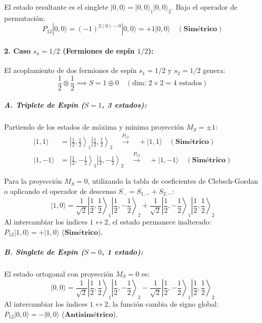 \begin{problema}
El estado resultante es el singlete $|0, 0\rangle = |0, 0\rangle_1 |0, 0\rangle_2$. Bajo el operador de permutación:
\begin{equation*}
P_{12} |0, 0\rangle = (-1)^{2(0) - 0} |0, 0\rangle = +1 |0, 0\rangle \quad (\mathbf{\text{Simétrico}})
\end{equation*}

\paragraph{2. Caso $s_a = 1/2$ (Fermiones de espín $1/2$):}
El acoplamiento de dos fermiones de espín $s_1 = 1/2$ y $s_2 = 1/2$ genera:
\begin{equation*}
\frac{1}{2} \otimes \frac{1}{2} \implies S = 1 \oplus 0 \quad (\text{dim: } 2 \times 2 = 4 \text{ estados})
\end{equation*}

\subparagraph{A. Triplete de Espín ($S = 1$, 3 estados):}
Partiendo de los estados de máxima y mínima proyección $M_S = \pm 1$:
\begin{align}
|1, 1\rangle &= \left|\frac{1}{2}, \frac{1}{2}\right\rangle_1 \left|\frac{1}{2}, \frac{1}{2}\right\rangle_2 \quad \xrightarrow{P_{12}} \quad +|1, 1\rangle \quad (\mathbf{\text{Simétrico}}) \\
|1, -1\rangle &= \left|\frac{1}{2}, -\frac{1}{2}\right\rangle_1 \left|\frac{1}{2}, -\frac{1}{2}\right\rangle_2 \quad \xrightarrow{P_{12}} \quad +|1, -1\rangle \quad (\mathbf{\text{Simétrico}})
\end{align}

Para la proyección $M_S = 0$, utilizando la tabla de coeficientes de Clebsch-Gordan o aplicando el operador de descenso $S_- = S_{1,-} + S_{2,-}$:
\begin{equation*}
|1, 0\rangle = \frac{1}{\sqrt{2}} \left|\frac{1}{2}, \frac{1}{2}\right\rangle_1 \left|\frac{1}{2}, -\frac{1}{2}\right\rangle_2 + \frac{1}{\sqrt{2}} \left|\frac{1}{2}, -\frac{1}{2}\right\rangle_1 \left|\frac{1}{2}, \frac{1}{2}\right\rangle_2
\end{equation*}
Al intercambiar los índices $1 \leftrightarrow 2$, el estado permanece inalterado: $P_{12} |1, 0\rangle = +|1, 0\rangle$ ($\mathbf{\text{Simétrico}}$).

\subparagraph{B. Singlete de Espín ($S = 0$, 1 estado):}
El estado ortogonal con proyección $M_S = 0$ es:
\begin{equation*}
|0, 0\rangle = \frac{1}{\sqrt{2}} \left|\frac{1}{2}, \frac{1}{2}\right\rangle_1 \left|\frac{1}{2}, -\frac{1}{2}\right\rangle_2 - \frac{1}{\sqrt{2}} \left|\frac{1}{2}, -\frac{1}{2}\right\rangle_1 \left|\frac{1}{2}, \frac{1}{2}\right\rangle_2
\end{equation*}
Al intercambiar los índices $1 \leftrightarrow 2$, la función cambia de signo global: $P_{12} |0, 0\rangle = -|0, 0\rangle$ ($\mathbf{\text{Antisimétrico}}$).


\end{problema}
